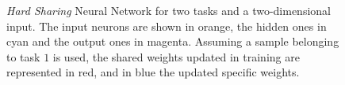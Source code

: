 \begin{figure}[t!]
    \caption[\emph{Hard Sharing} Neural Network for two tasks and a two-dimensional input.]{\emph{Hard Sharing} Neural Network for two tasks and a two-dimensional input. 
    The input neurons are shown in orange, the hidden ones in cyan and the output ones in magenta.
    Assuming a sample belonging to task $1$ is used, the shared weights updated in training are represented in red, and in blue the updated specific weights. 
    }
    \label{fig:hardsharing_nn}
\end{figure}